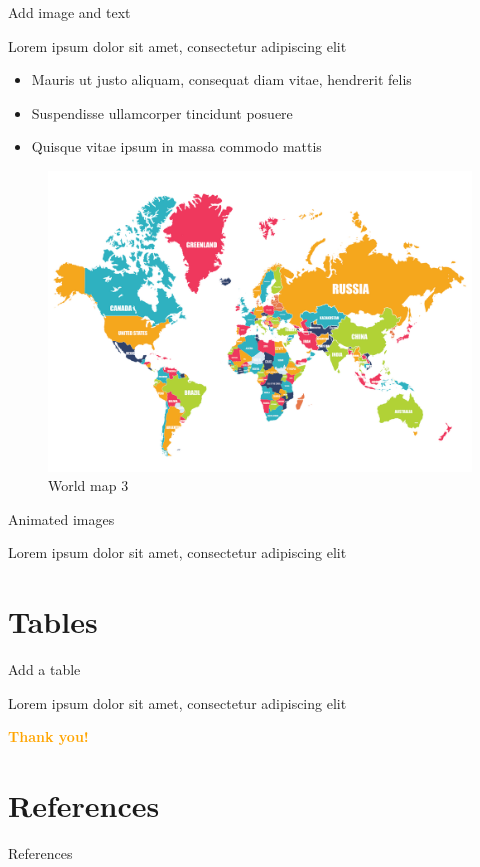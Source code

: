 \documentclass{beamer}
\begin{document}
\begin{frame}{Add image and text}

Lorem ipsum dolor sit amet, consectetur adipiscing elit

	\begin{multicols}{2}
		
		\begin{itemize}
			\item Mauris ut justo aliquam, consequat diam vitae, hendrerit felis
			\item Suspendisse ullamcorper tincidunt posuere
			\item Quisque vitae ipsum in massa commodo mattis
		\end{itemize}
		\begin{figure}
			\centering
			\includegraphics[width=\linewidth]{img/world-map}
			\caption{World map 3}
			\label{fig:world-map3}
		\end{figure}
		
	\end{multicols}

\end{frame}

\begin{frame}{Animated images}

Lorem ipsum dolor sit amet, consectetur adipiscing elit

\end{frame}

\section{Tables}
\begin{frame}{Add a table}

Lorem ipsum dolor sit amet, consectetur adipiscing elit

\end{frame}


\begin{frame}
	\centering\Huge\textcolor{orange}{\textbf{Thank you!}}
\end{frame}

\section{References}
\begin{frame}{References}
	\begin{tiny}\end{tiny}
\end{frame}
\end{document}
